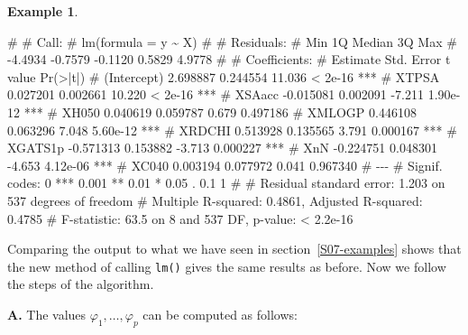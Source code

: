 \documentclass[
  a4paper,
]{article}
\newenvironment{Shaded}{\begin{snugshade}}{\end{snugshade}}
\newcommand{\CommentTok}[1]{\textcolor[rgb]{0.56,0.35,0.01}{\textit{#1}}}
\newcommand{\FunctionTok}[1]{\textcolor[rgb]{0.13,0.29,0.53}{\textbf{#1}}}
\newcommand{\NormalTok}[1]{#1}
\newcommand{\OtherTok}[1]{\textcolor[rgb]{0.56,0.35,0.01}{#1}}
\newcommand{\SpecialCharTok}[1]{\textcolor[rgb]{0.81,0.36,0.00}{\textbf{#1}}}
\theoremstyle{definition}
\theoremstyle{definition}
\newtheorem{example}{Example}[section]
\theoremstyle{definition}
\theoremstyle{definition}
\theoremstyle{remark}
\begin{document}
\begin{example}
\begin{Shaded}
\end{Shaded}

\begin{Shaded}
\begin{Highlighting}[]
\NormalTok{\# }
\NormalTok{\# Call:}
\NormalTok{\# lm(formula = y \textasciitilde{} X)}
\NormalTok{\# }
\NormalTok{\# Residuals:}
\NormalTok{\#     Min      1Q  Median      3Q     Max }
\NormalTok{\# {-}4.4934 {-}0.7579 {-}0.1120  0.5829  4.9778 }
\NormalTok{\# }
\NormalTok{\# Coefficients:}
\NormalTok{\#              Estimate Std. Error t value Pr(\textgreater{}|t|)    }
\NormalTok{\# (Intercept)  2.698887   0.244554  11.036  \textless{} 2e{-}16 ***}
\NormalTok{\# XTPSA        0.027201   0.002661  10.220  \textless{} 2e{-}16 ***}
\NormalTok{\# XSAacc      {-}0.015081   0.002091  {-}7.211 1.90e{-}12 ***}
\NormalTok{\# XH050        0.040619   0.059787   0.679 0.497186    }
\NormalTok{\# XMLOGP       0.446108   0.063296   7.048 5.60e{-}12 ***}
\NormalTok{\# XRDCHI       0.513928   0.135565   3.791 0.000167 ***}
\NormalTok{\# XGATS1p     {-}0.571313   0.153882  {-}3.713 0.000227 ***}
\NormalTok{\# XnN         {-}0.224751   0.048301  {-}4.653 4.12e{-}06 ***}
\NormalTok{\# XC040        0.003194   0.077972   0.041 0.967340    }
\NormalTok{\# {-}{-}{-}}
\NormalTok{\# Signif. codes:  0 \textquotesingle{}***\textquotesingle{} 0.001 \textquotesingle{}**\textquotesingle{} 0.01 \textquotesingle{}*\textquotesingle{} 0.05 \textquotesingle{}.\textquotesingle{} 0.1 \textquotesingle{} \textquotesingle{} 1}
\NormalTok{\# }
\NormalTok{\# Residual standard error: 1.203 on 537 degrees of freedom}
\NormalTok{\# Multiple R{-}squared:  0.4861,  Adjusted R{-}squared:  0.4785 }
\NormalTok{\# F{-}statistic:  63.5 on 8 and 537 DF,  p{-}value: \textless{} 2.2e{-}16}
\end{Highlighting}
\end{Shaded}

Comparing the output to what we have seen in section~\ref{S07-examples}
shows that the new method of calling \texttt{lm()} gives the same results
as before. Now we follow the steps of the algorithm.

\textbf{A.} The values \(\varphi_1, \ldots, \varphi_p\) can be computed as follows:


\end{example}
\end{document}
